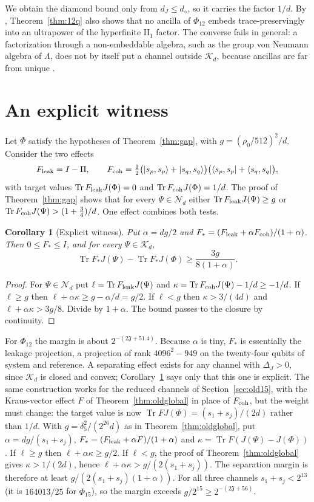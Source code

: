 \documentclass[11pt]{article}
\newtheorem{corollary}[theorem]{Corollary}
\newcommand{\Tr}{\operatorname{Tr}}
\newcommand{\K}{\mathcal K}
\newcommand{\N}{\mathcal N}
\newcommand{\cJ}{\mathfrak J}
\newcommand{\ket}[1]{\lvert #1\rangle}
\newcommand{\bra}[1]{\langle #1\rvert}
\begin{document}
We obtain the diamond bound only from $d_J\le d_\diamond$, so it carries the factor $1/d$.  By \cite[Theorem~3.6]{HaagerupMusat15}, Theorem~\ref{thm:12q} also shows that no ancilla of $\Phi_{12}$ embeds trace-preservingly into an ultrapower of the hyperfinite $\mathrm{II}_1$ factor.  The converse fails in general: a factorization through a non-embeddable algebra, such as the group von Neumann algebra of $\Lambda$, does not by itself put a channel outside $\K_d$, because ancillas are far from unique \cite[Example~3.5]{Musat25}.

\section{An explicit witness}\label{sec:witness}

Let $\Phi$ satisfy the hypotheses of Theorem~\ref{thm:gap}, with $g=(\rho_0/512)^2/d$.  Consider the two effects
\[
 F_{\rm leak}=I-\Pi,\qquad F_{\rm coh}=\tfrac12\bigl(\ket{s_p,s_p}+\ket{s_q,s_q}\bigr)\bigl(\bra{s_p,s_p}+\bra{s_q,s_q}\bigr),
\]
with target values $\Tr F_{\rm leak}J(\Phi)=0$ and $\Tr F_{\rm coh}J(\Phi)=1/d$.  The proof of Theorem~\ref{thm:gap} shows that for every $\Psi\in\N_d$ either $\Tr F_{\rm leak}J(\Psi)\ge g$ or $\Tr F_{\rm coh}J(\Psi)>(1+\tfrac34)/d$.  One effect combines both tests.

\begin{corollary}[Explicit witness]\label{cor:witness}
Put $\alpha=dg/2$ and $F_*=(F_{\rm leak}+\alpha F_{\rm coh})/(1+\alpha)$.  Then $0\le F_*\le I$, and for every $\Psi\in\K_d$,
\[
 \Tr F_*J(\Psi)-\Tr F_*J(\Phi)\ge\frac{3g}{8(1+\alpha)}.
\]
\end{corollary}
\begin{proof}
For $\Psi\in\N_d$ put $\ell=\Tr F_{\rm leak}J(\Psi)$ and $\kappa=\Tr F_{\rm coh}J(\Psi)-1/d\ge-1/d$.  If $\ell\ge g$ then $\ell+\alpha\kappa\ge g-\alpha/d=g/2$.  If $\ell<g$ then $\kappa>3/(4d)$ and $\ell+\alpha\kappa>3g/8$.  Divide by $1+\alpha$.  The bound passes to the closure by continuity.
\end{proof}

For $\Phi_{12}$ the margin is about $2^{-(2\cJ+51.4)}$.  Because $\alpha$ is tiny, $F_*$ is essentially the leakage projection, a projection of rank $4096^2-949$ on the twenty-four qubits of system and reference.  A separating effect exists for any channel with $\Delta_J>0$, since $\K_d$ is closed and convex; Corollary~\ref{cor:witness} says only that this one is explicit.  The same construction works for the reduced channels of Section~\ref{sec:old15}, with the Kraus-vector effect $F$ of Theorem~\ref{thm:oldglobal} in place of $F_{\rm coh}$, but the weight must change: the target value is now $\Tr FJ(\Phi)=(s_1+s_j)/(2d)$ rather than $1/d$.  With $g=\delta_5^2/(2^{26}d)$ as in Theorem~\ref{thm:oldglobal}, put $\alpha=dg/(s_1+s_j)$, $F_*=(F_{\rm leak}+\alpha F)/(1+\alpha)$ and $\kappa=\Tr F(J(\Psi)-J(\Phi))$.  If $\ell\ge g$ then $\ell+\alpha\kappa\ge g/2$.  If $\ell<g$, the proof of Theorem~\ref{thm:oldglobal} gives $\kappa>1/(2d)$, hence $\ell+\alpha\kappa>g/(2(s_1+s_j))$.  The separation margin is therefore at least $g/(2(s_1+s_j)(1+\alpha))$.  For all three channels $s_1+s_j<2^{13}$ (it is $164013/25$ for $\Phi_{15}$), so the margin exceeds $g/2^{15}\ge2^{-(2\cJ+56)}$.
\end{document}
